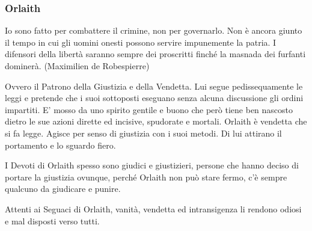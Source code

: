 \begin{multicols}{2}
\subsubsection{Orlaith}\label{orlaith}\hypertarget{orlaith}{}

\begin{enfasi}{
Io sono fatto per combattere il crimine, non per governarlo. Non è ancora giunto il tempo in cui gli uomini onesti possono servire impunemente la patria. I difensori della libertà saranno sempre dei proscritti finché la masnada dei furfanti dominerà. (Maximilien de Robespierre)
}\end{enfasi}

Ovvero il Patrono della Giustizia e della Vendetta. Lui segue pedissequamente le leggi e pretende che i suoi sottoposti eseguano senza alcuna discussione gli ordini impartiti. E' mosso da uno spirito gentile e buono che però tiene ben nascosto dietro le sue azioni dirette ed incisive, spudorate e mortali. Orlaith è vendetta che si fa legge. Agisce per senso di giustizia con i suoi metodi. Di lui attirano il portamento e lo sguardo fiero.

I Devoti di Orlaith spesso sono giudici e giustizieri, persone che hanno deciso di portare la giustizia ovunque, perché Orlaith non può stare fermo, c'è sempre qualcuno da giudicare e punire.

Attenti ai Seguaci di Orlaith, vanità, vendetta ed intransigenza li rendono odiosi e mal disposti verso tutti.


\end{multicols}
